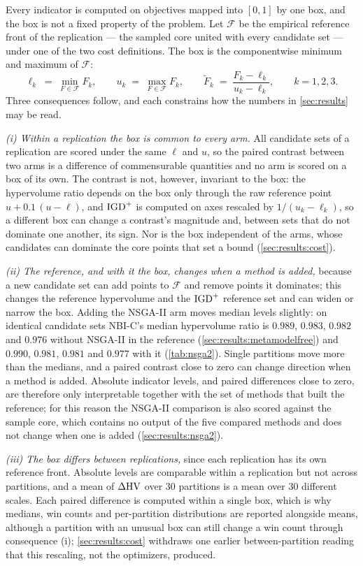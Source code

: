 Every indicator is computed on objectives mapped into $[0,1]$ by one box, and the box is not a fixed property of the
problem. Let $\mathcal{F}$ be the empirical reference front of the replication --- the sampled core united with every
candidate set --- under one of the two cost definitions. The box is the componentwise minimum and maximum of $\mathcal{F}$:
\begin{equation}
\ell_k \;=\; \min_{F \in \mathcal{F}} F_k, \qquad u_k \;=\; \max_{F \in \mathcal{F}} F_k, \qquad
\tilde F_k \;=\; \frac{F_k - \ell_k}{u_k - \ell_k}, \qquad k = 1,2,3 .
\label{eq:normbox}
\end{equation}
Three consequences follow, and each constrains how the numbers in \cref{sec:results} may be read.

\emph{(i) Within a replication the box is common to every arm.} All candidate sets of a replication are scored under
the same $\ell$ and $u$, so the paired contrast between two arms is a difference of commensurable quantities and no
arm is scored on a box of its own. The contrast is not, however, invariant to the box: the hypervolume ratio depends
on the box only through the raw reference point $u + 0.1\,(u-\ell)$, and $\mathrm{IGD}^{+}$ is computed on axes rescaled by
$1/(u_k-\ell_k)$, so a different box can change a contrast's magnitude and, between sets that do not dominate one
another, its sign. Nor is the box independent of the arms, whose candidates can dominate the core points that set a
bound (\cref{sec:results:cost}).

\emph{(ii) The reference, and with it the box, changes when a method is added,} because a new candidate set can add
points to $\mathcal{F}$ and remove points it dominates; this changes the reference hypervolume and the $\mathrm{IGD}^{+}$
reference set and can widen or narrow the box. Adding the NSGA-II arm moves median levels slightly: on identical
candidate sets NBI-C's median hypervolume ratio is $0.989$, $0.983$, $0.982$ and $0.976$ without NSGA-II in the
reference (\cref{sec:results:metamodelfree}) and $0.990$, $0.981$, $0.981$ and $0.977$ with it (\cref{tab:nsga2}).
Single partitions move more than the medians, and a paired contrast close to zero can change direction when a method
is added. Absolute indicator levels, and paired differences close to zero, are therefore only interpretable together
with the set of methods that built the reference; for this reason the NSGA-II comparison is also scored against the
sample core, which contains no output of the five compared methods and does not change when one is added
(\cref{sec:results:nsga2}).

\emph{(iii) The box differs between replications,} since each replication has its own reference front. Absolute
levels are comparable within a replication but not across partitions, and a mean of $\Delta\mathrm{HV}$ over 30 partitions is
a mean over 30 different scales. Each paired difference is computed within a single box, which is why medians, win
counts and per-partition distributions are reported alongside means, although a partition with an unusual box can
still change a win count through consequence (i); \cref{sec:results:cost} withdraws one earlier between-partition
reading that this rescaling, not the optimizers, produced.
